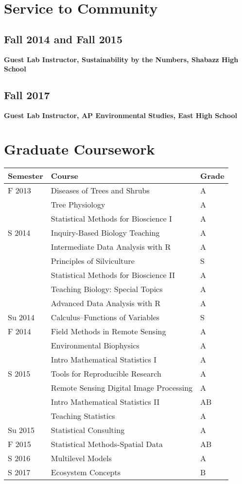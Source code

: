 \documentclass[11pt, sans]{moderncv}
\begin{document}
\section*{Service to Community}
\label{sec:orga100634}
\subsection*{Fall 2014 and Fall 2015}
\label{sec:orgfd4e949}
\textbf{Guest Lab Instructor, Sustainability by the Numbers, Shabazz High School}

\subsection*{Fall 2017}
\label{sec:org6fc0600}
\textbf{Guest Lab Instructor, AP Environmental Studies, East High School}


\section*{Graduate Coursework}
\label{sec:orgc82d5d5}
\begin{center}
\begin{tabular}{lll}
Semester & Course & Grade\\
\hline
F 2013 & Diseases of Trees and Shrubs & A\\
 & Tree Physiology & A\\
 & Statistical Methods for Bioscience I & A\\
S 2014 & Inquiry-Based Biology Teaching & A\\
 & Intermediate Data Analysis with R & A\\
 & Principles of Silviculture & S\\
 & Statistical Methods for Bioscience II & A\\
 & Teaching Biology: Special Topics & A\\
 & Advanced Data Analysis with R & A\\
Su 2014 & Calculus--Functions of Variables & S\\
F 2014 & Field Methods in Remote Sensing & A\\
 & Environmental Biophysics & A\\
 & Intro Mathematical Statistics I & A\\
S 2015 & Tools for Reproducible Research & A\\
 & Remote Sensing Digital Image Processing & A\\
 & Intro Mathematical Statistics II & AB\\
 & Teaching Statistics & A\\
Su 2015 & Statistical Consulting & A\\
F 2015 & Statistical Methods-Spatial Data & AB\\
S 2016 & Multilevel Models & A\\
S 2017 & Ecosystem Concepts & B\\
\end{tabular}
\end{center}
\end{document}
